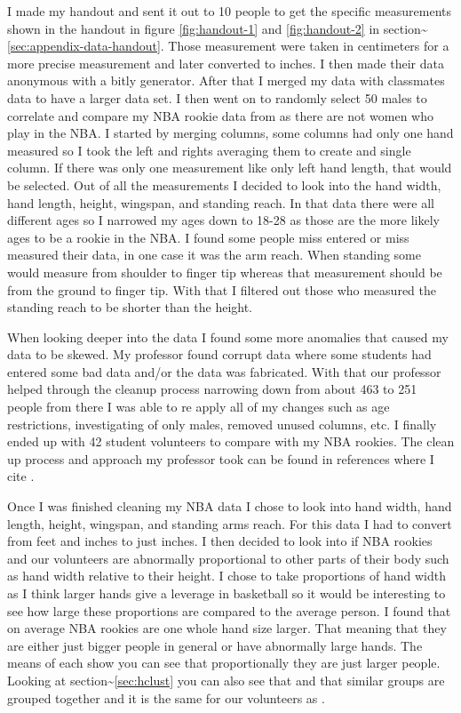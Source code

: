 \documentclass[]{article}
\begin{document}
I made my handout and sent it out to 10 people to get the specific
measurements shown in the handout in figure \ref{fig:handout-1} and
\ref{fig:handout-2} in
section\textasciitilde{}\ref{sec:appendix-data-handout}. Those
measurement were taken in centimeters for a more precise measurement and
later converted to inches. I then made their data anonymous with a bitly
generator. After that I merged my data with classmates data to have a
larger data set. I then went on to randomly select 50 males to correlate
and compare my NBA rookie data from \citep{NBAdata} as there are not
women who play in the NBA. I started by merging columns, some columns
had only one hand measured so I took the left and rights averaging them
to create and single column. If there was only one measurement like only
left hand length, that would be selected. Out of all the measurements I
decided to look into the hand width, hand length, height, wingspan, and
standing reach. In that data there were all different ages so I narrowed
my ages down to 18-28 as those are the more likely ages to be a rookie
in the NBA. I found some people miss entered or miss measured their
data, in one case it was the arm reach. When standing some would measure
from shoulder to finger tip whereas that measurement should be from the
ground to finger tip. With that I filtered out those who measured the
standing reach to be shorter than the height. \newline

\noindent When looking deeper into the data I found some more anomalies
that caused my data to be skewed. My professor found corrupt data where
some students had entered some bad data and/or the data was fabricated.
With that our professor helped through the cleanup process narrowing
down from about 463 to 251 people from there I was able to re apply all
of my changes such as age restrictions, investigating of only males,
removed unused columns, etc. I finally ended up with 42 student
volunteers to compare with my NBA rookies. The clean up process and
approach my professor took can be found in references where I cite
\citep{MonteShaffer}. \newline

\noindent Once I was finished cleaning my NBA data I chose to look into
hand width, hand length, height, wingspan, and standing arms reach. For
this data I had to convert from feet and inches to just inches. I then
decided to look into if NBA rookies and our volunteers are abnormally
proportional to other parts of their body such as hand width relative to
their height. I chose to take proportions of hand width as I think
larger hands give a leverage in basketball so it would be interesting to
see how large these proportions are compared to the average person. I
found that on average NBA rookies are one whole hand size larger. That
meaning that they are either just bigger people in general or have
abnormally large hands. The means of each show you can see that
proportionally they are just larger people. Looking at
section\textasciitilde{}\ref{sec:hclust} you can also see that and that
similar groups are grouped together and it is the same for our
volunteers as . \newline
\end{document}
